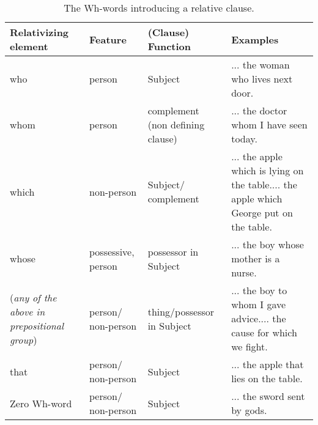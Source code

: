 \begin{table}[!ht]
	\begin{tabulary}{\textwidth}{|L|L|L|L|}
		\hline 
		\textbf{Relativizing element} & \textbf{Feature} & \textbf{(Clause) Function} & \textbf{Examples} \\ 
		\hline 
		who & person & Subject & ... the woman who lives next door. \\ 
		\hline 
		whom & person & complement (non defining clause) & ... the doctor whom I have seen today. \\ 
		\hline 
		which & non-person & Subject/ complement & ... the apple which is lying on the table.\newline... the apple which George put on the table.  \\ 
		\hline 
		whose & possessive, person & possessor in Subject & ... the boy whose mother is a nurse. \\ 
		\hline
		(\textit{any of the above in prepositional group}) &  person/ non-person & thing/possessor in Subject &  ... the boy to whom I gave advice.\newline... the cause for which we fight. \\
		\hline
		that & person/ non-person & Subject & ... the apple that lies on the table. \\
		\hline
		Zero Wh-word & person/ non-person & Subject & ... the sword sent by gods. \\
		\hline
	\end{tabulary} 
	\caption{The Wh-words introducing a relative clause.}
	\label{tab:wh2}
\end{table}


